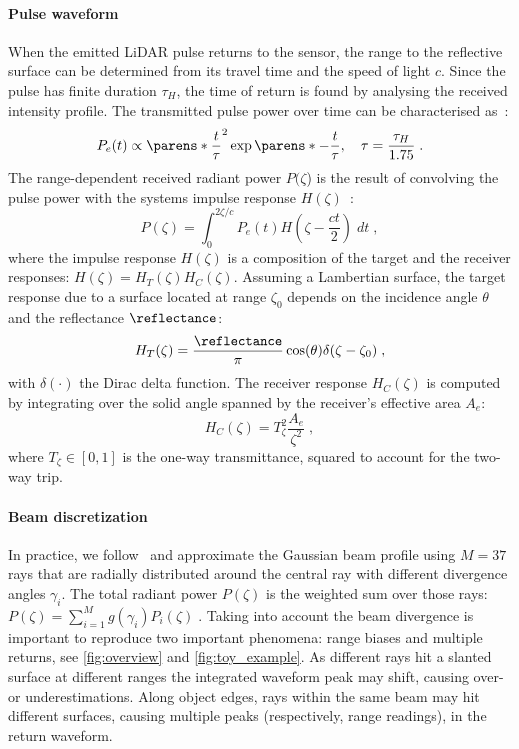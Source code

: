 \paragraph{Pulse waveform}
When the emitted LiDAR pulse returns to the sensor, the range to the reflective surface can be determined from its travel time and the speed of light $c$. Since the pulse has finite duration $\tau_H$, the time of return is found by analysing the received intensity profile. The transmitted pulse power over time can be characterised as~\cite{carlsson2001signature}:
\begin{equation}
    P_e(t) \propto \parens*{\frac{t}{\tau}}^2 \exp\parens*{-\frac{t}{\tau}},\quad \tau = \frac{\tau_H}{1.75}\;.
\label{eq:pulse}
\end{equation}
The range-dependent received radiant power $P(\zeta$) is the result of convolving the pulse power with the systems impulse response $H(\zeta)$~\cite{rasshofer2011influences,hahner2021fog,hahner2022lidar}:
\begin{equation}
    P(\zeta) = \int_0^{2\zeta/c} P_e(t) H(\zeta - \frac{ct}{2}) \; dt\;,
\end{equation}
where the impulse response $H(\zeta)$ is a composition of the target and the receiver responses: $H(\zeta) =  H_T(\zeta) H_C(\zeta)$.
Assuming a Lambertian surface, the target response due to a surface located at range $\zeta_0$ depends on the incidence angle $\theta$ and the reflectance $\reflectance$:
\begin{equation}
    H_T(\zeta) = \frac{\reflectance}{\pi} \cos(\theta) \delta(\zeta - \zeta_0)\;, 
\label{eq:ht}
\end{equation}
with $\delta(\cdot)$ the Dirac delta function.
The receiver response $H_C(\zeta)$ is computed by integrating over the solid angle spanned by the receiver's effective area $A_e$:
\begin{equation}
   H_C(\zeta) = T^2_{\zeta} \frac{A_e}{\zeta^2}\;,
\label{eq:hc}
\end{equation}
where $T_{\zeta} \in [0,1]$ is the one-way transmittance, squared to account for the two-way trip.


\paragraph{Beam discretization}
In practice, we follow~\cite{winiwarter2022virtual} and approximate the Gaussian beam profile using $M\!=\!37$ rays that are radially distributed around the central ray with different divergence angles $\gamma_i$. The total radiant power $P(\zeta)$ is the weighted sum over those rays: $P(\zeta) = \sum_{i=1}^M g(\gamma_i) P_i(\zeta)\;.$
Taking into account the beam divergence is important to reproduce two important phenomena: range biases and multiple returns, see \cref{fig:overview} and \cref{fig:toy_example}. As different rays hit a slanted surface at different ranges the integrated waveform peak may shift, causing over- or underestimations. Along object edges, rays within the same beam may hit different surfaces, causing multiple peaks (respectively, range readings), in the return waveform.


